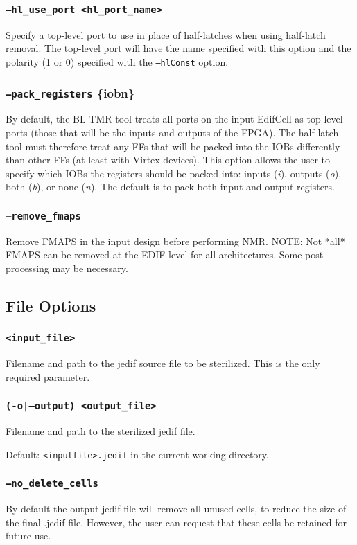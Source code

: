 \subsubsection{\texttt{--hl\_use\_port <hl\_port\_name>}}
Specify a top-level port to use in place of half-latches when 
using half-latch removal. The top-level port will have the name specified with 
this option and the polarity (1 or 0) specified with the \texttt{--hlConst} 
option.

\subsubsection{\texttt{--pack\_registers} \{i\textbar o\textbar b\textbar n\}}
By default, the BL-TMR tool treats all ports on the input EdifCell as top-level
ports (those that will be the inputs and outputs of the FPGA). The half-latch 
tool must therefore treat any FFs that will be packed into the IOBs differently
than other FFs (at least with Virtex devices). This option allows the user to
specify which IOBs the registers should be packed into: inputs (\emph{i}),
outputs (\emph{o}), both (\emph{b}), or none (\emph{n}). The default is to pack
both input and output registers.

\subsubsection{\texttt{--remove\_fmaps}}
Remove FMAPS in the input design before performing NMR.
NOTE: Not *all* FMAPS can be removed at the EDIF level for all
architectures. Some post-processing may be necessary.

\subsection{File Options}

\subsubsection{\texttt{<input\_file>}}
Filename and path to the jedif source file to be
sterilized. This is the only required parameter.

\subsubsection{\texttt{(-o|--output) <output\_file>}}
Filename and path to the sterilized jedif file. 

Default: \texttt{<inputfile>.jedif} in the current working directory.


\subsubsection{\texttt{--no\_delete\_cells}}
By default the output jedif file will remove all unused cells, to 
reduce the size of the final .jedif file. 
However, the user can request that these cells be retained for 
future use.



